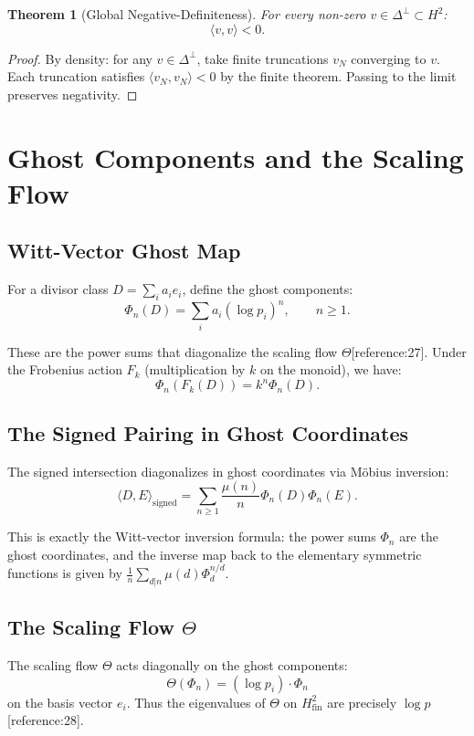 \documentclass[11pt,a4paper]{article}
\newtheorem{theorem}{Theorem}[section]
\begin{document}
\begin{theorem}[Global Negative-Definiteness]
For every non-zero $v \in \Delta^\perp \subset H^2$:
\[
\langle v, v \rangle < 0.
\]
\end{theorem}

\begin{proof}
By density: for any $v \in \Delta^\perp$, take finite truncations $v_N$ converging to $v$. Each truncation satisfies $\langle v_N, v_N \rangle < 0$ by the finite theorem. Passing to the limit preserves negativity.
\end{proof}

\section{Ghost Components and the Scaling Flow}

\subsection{Witt-Vector Ghost Map}

For a divisor class $D = \sum_i a_i e_i$, define the ghost components:
\[
\Phi_n(D) = \sum_i a_i (\log p_i)^n, \qquad n \ge 1.
\]

These are the power sums that diagonalize the scaling flow $\Theta$[reference:27]. Under the Frobenius action $F_k$ (multiplication by $k$ on the monoid), we have:
\[
\Phi_n(F_k(D)) = k^n \Phi_n(D).
\]

\subsection{The Signed Pairing in Ghost Coordinates}

The signed intersection diagonalizes in ghost coordinates via Möbius inversion:
\[
\langle D, E \rangle_{\text{signed}} = \sum_{n \ge 1} \frac{\mu(n)}{n} \Phi_n(D) \Phi_n(E).
\]

This is exactly the Witt-vector inversion formula: the power sums $\Phi_n$ are the ghost coordinates, and the inverse map back to the elementary symmetric functions is given by $\frac{1}{n} \sum_{d|n} \mu(d) \Phi_d^{n/d}$.

\subsection{The Scaling Flow $\Theta$}

The scaling flow $\Theta$ acts diagonally on the ghost components:
\[
\Theta(\Phi_n) = (\log p_i) \cdot \Phi_n
\]
on the basis vector $e_i$. Thus the eigenvalues of $\Theta$ on $H^2_{\text{fin}}$ are precisely $\log p$[reference:28].
\end{document}
